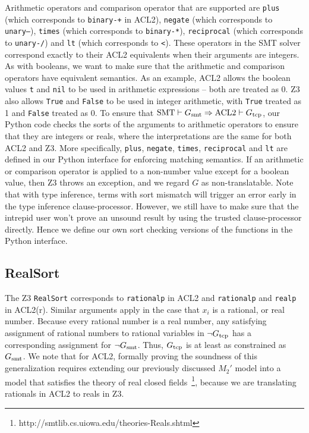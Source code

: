 Arithmetic operators and comparison operator that are supported are
\texttt{plus} (which corresponds to \texttt{binary-+} in ACL2),
\texttt{negate} (which corresponds to \texttt{unary--}),
\texttt{times} (which corresponds to \texttt{binary-*}),
\texttt{reciprocal} (which corresponds to \texttt{unary-/}) and
\texttt{lt} (which corresponds to \texttt{<}).
These operators in the \acs{SMT} solver correspond exactly to their ACL2
equivalents when their arguments are integers.
As with booleans, we want to make sure that the arithmetic and comparison
operators have equivalent semantics.
As an example, ACL2 allows the boolean values \texttt{t} and \texttt{nil} to be
used in arithmetic expressions -- both are treated as 0.
Z3 also allows \texttt{True} and \texttt{False} to be used in integer
arithmetic, with \texttt{True} treated as 1 and \texttt{False} treated as 0.
To ensure that $\mathrm{SMT} \vdash G_{\mathrm{smt}} \Rightarrow \mathrm{ACL2} \vdash
G_{\mathrm{tcp}}$, our Python code checks the sorts of the arguments to arithmetic
operators to ensure that they are integers or reals, where the interpretations
are the same for both ACL2 and Z3.
More specifically, \texttt{plus}, \texttt{negate}, \texttt{times},
\texttt{reciprocal} and \texttt{lt} are defined in our Python interface
for enforcing matching semantics.
If an arithmetic or comparison operator is applied to a non-number value except
for a boolean value, then Z3 throws an exception, and we regard $G$ as
non-translatable.
Note that with type inference, terms with sort mismatch will trigger an error
early in the type inference clause-processor.
However, we still have to make sure that the intrepid user won't prove an
unsound result by using the trusted clause-processor directly.
Hence we define our own sort checking versions of the functions in the Python
interface.

\subsection{RealSort}\label{subsec:reals}
The Z3 \texttt{RealSort} corresponds to \texttt{rationalp} in ACL2 and
\texttt{rationalp} and \texttt{realp} in ACL2(r).
Similar arguments apply in the case that $x_i$ is a rational, or real number.
Because every rational number is a real number, any satisfying assignment of
rational numbers to rational variables in $\neg G_{\mathrm{tcp}}$ has a corresponding
assignment for $\neg G_{\mathrm{smt}}$. Thus, $G_{\mathrm{tcp}}$ is at least as constrained as
$G_{\mathrm{smt}}$.
We note that for ACL2, formally proving the soundness of this generalization
requires extending our previously discussed $M_2'$ model into a model that
satisfies the theory of real closed
fields~\footnote{http://smtlib.cs.uiowa.edu/theories-Reals.shtml}, because we
are translating rationals in ACL2 to reals in Z3. 

